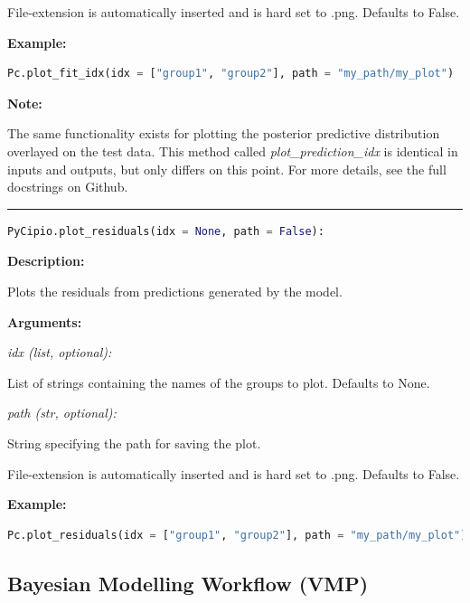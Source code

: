\documentclass{article}
\begin{document}
\indent \indent \indent File-extension is automatically inserted and is hard set to .png. Defaults to False.

\indent \textbf{Example:}

\begin{lstlisting}[language=Python]
        Pc.plot_fit_idx(idx = ["group1", "group2"], path = "my_path/my_plot")
\end{lstlisting}

\noindent \textbf{Note:}

\noindent The same functionality exists for plotting the posterior predictive distribution overlayed on the test data. This method called \textit{plot\_prediction\_idx} is identical in inputs and outputs, but only differs on this point. For more details, see the full docstrings on Github. 

\vspace{5mm}


\hrule

\begin{lstlisting}[language=Python]
    PyCipio.plot_residuals(idx = None, path = False):
\end{lstlisting}

\indent \textbf{Description:} 

\indent \indent Plots the residuals from predictions generated by the model.

\indent \textbf{Arguments:}

\indent \indent \textit{idx (list, optional):}

\indent \indent \indent List of strings containing the names of the groups to plot. Defaults to None.

\indent \indent \textit{path (str, optional):}

\indent \indent \indent String specifying the path for saving the plot. 

\indent \indent \indent File-extension is automatically inserted and is hard set to .png. Defaults to False.

\indent \textbf{Example:}

\begin{lstlisting}[language=Python]
        Pc.plot_residuals(idx = ["group1", "group2"], path = "my_path/my_plot")
\end{lstlisting}

\subsection{Bayesian Modelling Workflow (VMP)}
\end{document}
